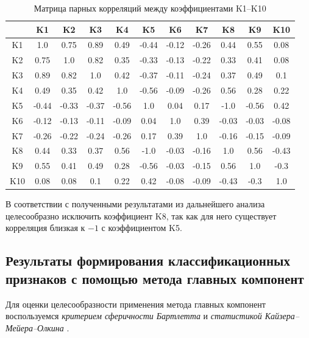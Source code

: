 \documentclass[14pt,a4paper]{extarticle}
\begin{document}
\begin{table}[H]
    \centering
    \caption{Матрица парных корреляций между коэффициентами K1--K10}
    \label{tab:corr}
    \small
    \begin{tabular}{c|cccccccccc}
        \toprule
        & K1 & K2 & K3 & K4 & K5 & K6 & K7 & K8 & K9 & K10 \\
        \midrule
        K1 & 1.0 & 0.75 & 0.89 & 0.49 & -0.44 & -0.12 & -0.26 & 0.44 & 0.55 & 0.08 \\ 
        K2 & 0.75 & 1.0 & 0.82 & 0.35 & -0.33 & -0.13 & -0.22 & 0.33 & 0.41 & 0.08 \\ 
        K3 & 0.89 & 0.82 & 1.0 & 0.42 & -0.37 & -0.11 & -0.24 & 0.37 & 0.49 & 0.1 \\ 
        K4 & 0.49 & 0.35 & 0.42 & 1.0 & -0.56 & -0.09 & -0.26 & 0.56 & 0.28 & 0.22 \\ 
        K5 & -0.44 & -0.33 & -0.37 & -0.56 & 1.0 & 0.04 & 0.17 & -1.0 & -0.56 & 0.42 \\ 
        K6 & -0.12 & -0.13 & -0.11 & -0.09 & 0.04 & 1.0 & 0.39 & -0.03 & -0.03 & -0.08 \\ 
        K7 & -0.26 & -0.22 & -0.24 & -0.26 & 0.17 & 0.39 & 1.0 & -0.16 & -0.15 & -0.09 \\ 
        K8 & 0.44 & 0.33 & 0.37 & 0.56 & -1.0 & -0.03 & -0.16 & 1.0 & 0.56 & -0.43 \\ 
        K9 & 0.55 & 0.41 & 0.49 & 0.28 & -0.56 & -0.03 & -0.15 & 0.56 & 1.0 & -0.3 \\ 
        K10 & 0.08 & 0.08 & 0.1 & 0.22 & 0.42 & -0.08 & -0.09 & -0.43 & -0.3 & 1.0 \\ 
        \bottomrule
    \end{tabular}
\end{table}

В соответствии с полученными результатами из дальнейшего анализа целесообразно исключить коэффициент K8, 
так как для него существует корреляция близкая к $-1$ с коэффициентом K5.

\subsection{Результаты формирования классификационных признаков с помощью метода главных компонент}

Для оценки целесообразности применения метода главных компонент воспользуемся \textit{критерием 
сферичности Бартлетта} \cite{bartlett1950} и \textit{статистикой Кайзера--Мейера--Олкина} \cite{cerny1977}.
\end{document}
